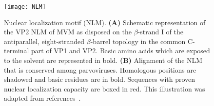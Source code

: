 \makeatletter
\setlength{\@fptop}{0pt}
\makeatother

\begin{figure}[t!]
\centering
  \texttt{[image: NLM]} \\[0.35cm]
  \caption[Nuclear Localization Motif (NLM)] 
   {Nuclear localization motif (NLM). \textbf{(A)} Schematic representation of the VP2 NLM of MVM as disposed on the $\beta$-strand I of the antiparallel, eight-stranded $\beta$-barrel topology in the common C-terminal part of VP1 and VP2. Basic amino acids which are exposed to the solvent are represented in bold. \textbf{(B)} Alignment of the NLM that is conserved among parvoviruses. Homologous positions are shadowed and basic residues are in bold. Sequences with proven nuclear localization capacity are boxed in red. This illustration was adapted from references~\cite{pmid10729155, almendral}.} 
\label{NLM}
\end{figure}


